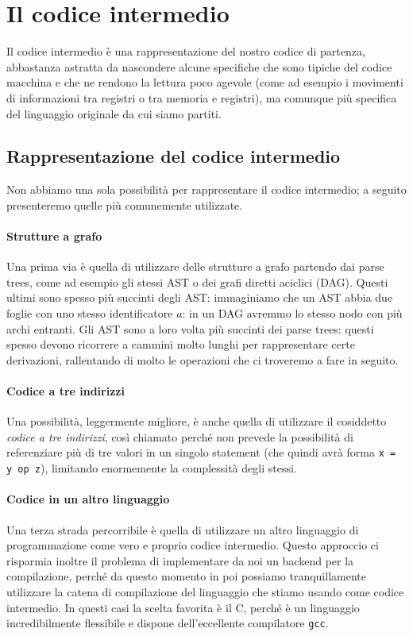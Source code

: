 \documentclass[class=book, crop=false, oneside, 12pt]{standalone}
\begin{document}
\section{Il codice intermedio}
Il codice  intermedio è una rappresentazione del nostro codice di partenza, abbastanza astratta da nascondere alcune specifiche che sono tipiche del codice macchina e che ne rendono la lettura poco agevole (come ad esempio i movimenti di informazioni tra registri o tra memoria e registri), ma comunque più specifica del linguaggio originale da cui siamo partiti.

\subsection{Rappresentazione del codice intermedio}
Non abbiamo una sola possibilità per rappresentare il codice intermedio; a seguito presenteremo quelle più comunemente utilizzate.

\paragraph{Strutture a grafo}
Una prima via è quella di utilizzare delle strutture a grafo partendo dai parse trees, come ad esempio gli stessi AST o dei grafi diretti aciclici (DAG). Questi ultimi sono spesso più succinti degli AST: immaginiamo che un AST abbia due foglie con uno stesso identificatore \(a\): in un DAG avremmo lo stesso nodo con più archi entranti. Gli AST sono a loro volta più succinti dei parse trees: questi spesso devono ricorrere a cammini molto lunghi per rappresentare certe derivazioni, rallentando di molto le operazioni che ci troveremo a fare in seguito.

\paragraph{Codice a tre indirizzi}
Una possibilità, leggermente migliore, è anche quella di utilizzare il cosiddetto \emph{codice a tre indirizzi}, così chiamato perché non prevede la possibilità di referenziare più di tre valori in un singolo statement (che quindi avrà forma \texttt{x = y op z}), limitando enormemente la complessità degli stessi.

\paragraph{Codice in un altro linguaggio}
Una terza strada percorribile è quella di utilizzare un altro linguaggio di programmazione come vero e proprio codice intermedio. Questo approccio ci risparmia inoltre il problema di implementare da noi un backend per la compilazione, perché da questo momento in poi possiamo tranquillamente utilizzare la catena di compilazione del linguaggio che stiamo usando come codice intermedio. In questi casi la scelta favorita è il C, perché è un linguaggio incredibilmente flessibile e dispone dell'eccellente compilatore \texttt{gcc}.
\end{document}
